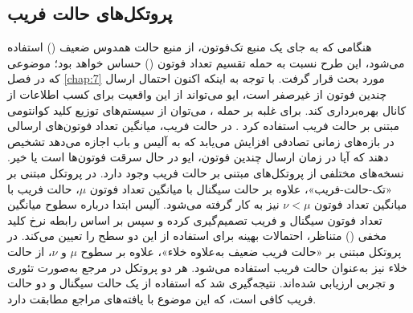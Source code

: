 \subsection{پروتکل‌های حالت فریب}
\label{subsec:8-1-2}
هنگامی که به جای یک منبع تک‌فوتون، از منبع حالت همدوس ضعیف () استفاده می‌شود، این طرح نسبت به حمله تقسیم تعداد فوتون () حساس خواهد بود؛ موضوعی که در فصل \ref{chap:7} مورد بحث قرار گرفت. با توجه به اینکه اکنون احتمال ارسال چندین فوتون از  غیر‌صفر است، ایو می‌تواند از این واقعیت برای کسب اطلاعات از کانال بهره‌برداری کند. برای غلبه بر حمله ، می‌توان از سیستم‌های توزیع کلید کوانتومی مبتنی بر حالت فریب استفاده کرد \cite{8-10, 8-11, 8-12, 8-13, 8-14, 8-15, 8-16, 8-17, 8-18, 8-19, 8-20, 8-21, 8-22}. در  حالت فریب، میانگین تعداد فوتون‌های ارسالی در بازه‌های زمانی تصادفی افزایش می‌یابد که به آلیس و باب اجازه می‌دهد تشخیص دهند که آیا در زمان ارسال چندین فوتون، ایو در حال سرقت فوتون‌ها است یا خیر. نسخه‌های مختلفی از پروتکل‌های مبتنی بر حالت فریب وجود دارد. در پروتکل مبتنی بر «تک-حالت-فریب»، علاوه بر حالت سیگنال با میانگین تعداد فوتون $\mu$، حالت فریب با میانگین تعداد فوتون $\nu < \mu$ نیز به کار گرفته می‌شود. آلیس ابتدا درباره سطوح میانگین تعداد فوتون سیگنال و فریب تصمیم‌گیری کرده و سپس بر اساس رابطه نرخ کلید مخفی () متناظر، احتمالات بهینه برای استفاده از این دو سطح را تعیین می‌کند. در پروتکل مبتنی بر «حالت فریب ضعیف به‌علاوه خلاء»، علاوه بر سطوح $\mu$ و $\nu$، از حالت خلاء نیز به‌عنوان حالت فریب استفاده می‌شود. هر دو پروتکل در مرجع \cite{8-19} به‌صورت تئوری و تجربی ارزیابی شده‌اند. نتیجه‌گیری شد که استفاده از یک حالت سیگنال و دو حالت فریب کافی است، که این موضوع با یافته‌های مراجع \cite{8-20, 8-21} مطابقت دارد.

